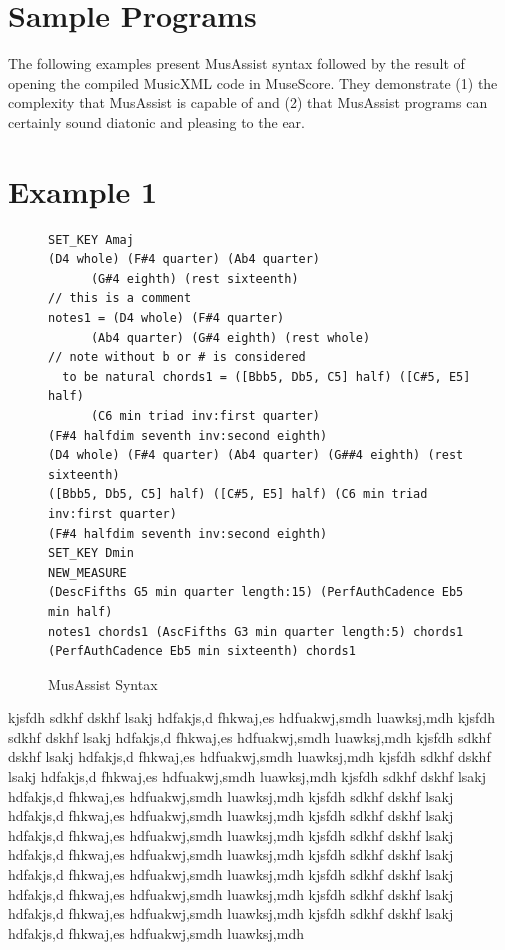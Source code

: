 \documentclass{article}
\begin{document}
\section{Sample Programs}
The following examples present MusAssist syntax followed by the result of
 opening the compiled MusicXML code in MuseScore. 
They demonstrate (1) the complexity that MusAssist is capable of and (2) 
that MusAssist programs can certainly sound diatonic and pleasing to the ear.

\section{Example 1}
\begin{figure}[h!]
\begin{verbatim}
SET_KEY Amaj
(D4 whole) (F#4 quarter) (Ab4 quarter) 
      (G#4 eighth) (rest sixteenth)           
// this is a comment
notes1 = (D4 whole) (F#4 quarter) 
      (Ab4 quarter) (G#4 eighth) (rest whole)  
// note without b or # is considered 
  to be natural chords1 = ([Bbb5, Db5, C5] half) ([C#5, E5] half) 
      (C6 min triad inv:first quarter) 
(F#4 halfdim seventh inv:second eighth)
(D4 whole) (F#4 quarter) (Ab4 quarter) (G##4 eighth) (rest sixteenth)
([Bbb5, Db5, C5] half) ([C#5, E5] half) (C6 min triad inv:first quarter) 
(F#4 halfdim seventh inv:second eighth)
SET_KEY Dmin
NEW_MEASURE
(DescFifths G5 min quarter length:15) (PerfAuthCadence Eb5 min half)
notes1 chords1 (AscFifths G3 min quarter length:5) chords1 
(PerfAuthCadence Eb5 min sixteenth) chords1
\end{verbatim}
\caption{MusAssist Syntax}
\end{figure}
kjsfdh sdkhf dskhf lsakj hdfakjs,d fhkwaj,es hdfuakwj,smdh luawksj,mdh 
kjsfdh sdkhf dskhf lsakj hdfakjs,d fhkwaj,es hdfuakwj,smdh luawksj,mdh 
kjsfdh sdkhf dskhf lsakj hdfakjs,d fhkwaj,es hdfuakwj,smdh luawksj,mdh 
kjsfdh sdkhf dskhf lsakj hdfakjs,d fhkwaj,es hdfuakwj,smdh luawksj,mdh 
kjsfdh sdkhf dskhf lsakj hdfakjs,d fhkwaj,es hdfuakwj,smdh luawksj,mdh 
kjsfdh sdkhf dskhf lsakj hdfakjs,d fhkwaj,es hdfuakwj,smdh luawksj,mdh 
kjsfdh sdkhf dskhf lsakj hdfakjs,d fhkwaj,es hdfuakwj,smdh luawksj,mdh 
kjsfdh sdkhf dskhf lsakj hdfakjs,d fhkwaj,es hdfuakwj,smdh luawksj,mdh 
kjsfdh sdkhf dskhf lsakj hdfakjs,d fhkwaj,es hdfuakwj,smdh luawksj,mdh 
kjsfdh sdkhf dskhf lsakj hdfakjs,d fhkwaj,es hdfuakwj,smdh luawksj,mdh 
kjsfdh sdkhf dskhf lsakj hdfakjs,d fhkwaj,es hdfuakwj,smdh luawksj,mdh 
kjsfdh sdkhf dskhf lsakj hdfakjs,d fhkwaj,es hdfuakwj,smdh luawksj,mdh 
\end{document}
